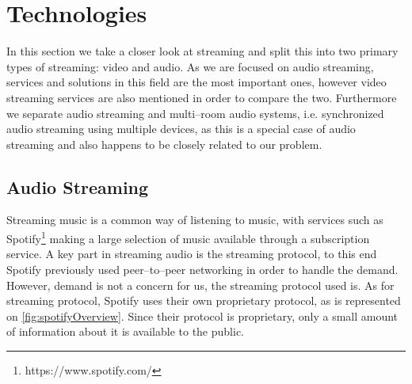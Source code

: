 




\section{Technologies}\label{sec:sota_technologies}
In this section we take a closer look at streaming and split this into two primary types of streaming: video and audio.
As we are focused on audio streaming, services and solutions in this field are the most important ones, however video streaming services are also mentioned in order to compare the two.
Furthermore we separate audio streaming and multi--room audio systems, i.e. synchronized audio streaming using multiple devices, as this is a special case of audio streaming and also happens to be closely related to our problem.

\subsection{Audio Streaming}
Streaming music is a common way of listening to music, with services such as Spotify\footnote{https://www.spotify.com/} making a large selection of music available through a subscription service.
A key part in streaming audio is the streaming protocol, to this end Spotify previously used peer--to--peer networking in order to handle the demand.\cite{spotify1}
However, demand is not a concern for us, the streaming protocol used is.
As for streaming protocol, Spotify uses their own proprietary protocol, as is represented on \cref{fig:spotifyOverview}.\cite{spotifySlides} %
Since their protocol is proprietary, only a small amount of information about it is available to the public.

